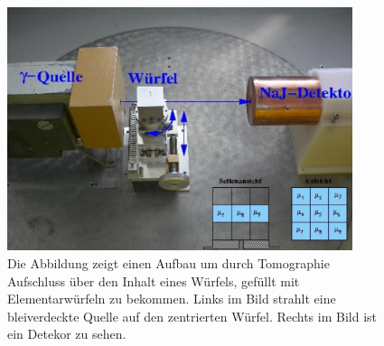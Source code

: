 \begin{figure}
    \centering
    \includegraphics[width=0.9\textwidth]{bilder/test.png}
    \caption{Die Abbildung zeigt einen Aufbau um durch Tomographie Aufschluss über den Inhalt eines Würfels, gefüllt mit Elementarwürfeln zu bekommen.
    Links im Bild strahlt eine bleiverdeckte Quelle auf den zentrierten Würfel. Rechts im Bild ist ein Detekor zu sehen. \cite{skript}}
    \label{fig:1}
\end{figure}
